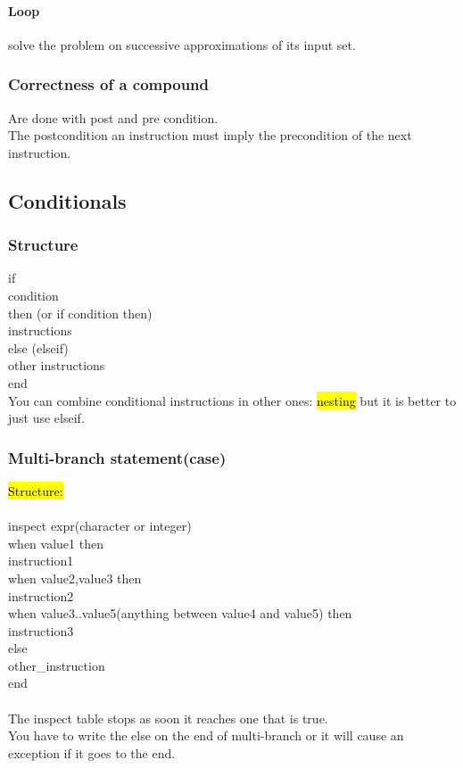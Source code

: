 \documentclass[11pt]{article}
\newcommand\tab[1][1cm]{\hspace*{#1}}
\begin{document}
\paragraph{Loop}
solve the problem on successive approximations of its input set.
\subsubsection{Correctness of a compound}
Are done with post and pre condition.\\The postcondition an instruction must imply the precondition of the next instruction.
\subsection{Conditionals}
\subsubsection{Structure}
if\\\tab condition\\then (or if condition then)\\\tab instructions\\else (elseif) \\\tab other instructions\\end
\\You can combine conditional instructions in other ones: \hl{nesting} but it is better to just use elseif.
\subsubsection{Multi-branch statement(case)}
\hl{Structure:}\\\\
inspect expr(character or integer)\\\tab when value1 then\\\tab\tab instruction1\\\tab when value2,value3 then\\\tab\tab instruction2\\\tab when value3..value5(anything between value4 and value5) then\\\tab\tab instruction3 \\\tab else\\\tab\tab other\_instruction\\end\\\\
The inspect table stops as soon it reaches one that is true.\\ You have to write the else on the end of multi-branch or it will cause an exception if it goes to the end.
\end{document}
